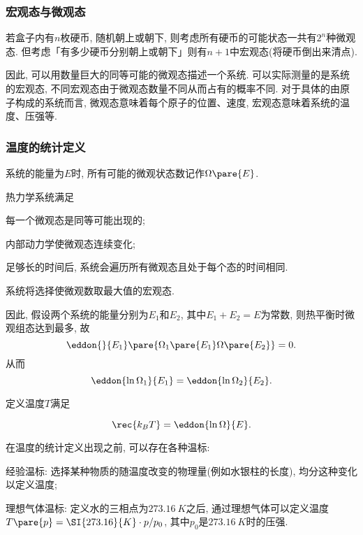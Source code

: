 \documentclass[../Thermal.tex]{subfiles}
\begin{document}
\subsubsection{宏观态与微观态}
\begin{ex}
若盒子内有$n$枚硬币, 随机朝上或朝下, 则考虑所有硬币的可能状态一共有$2^n$种微观态. 但考虑「有多少硬币分别朝上或朝下」则有$n+1$中宏观态(将硬币倒出来清点).
\end{ex}
因此, 可以用数量巨大的同等可能的微观态描述一个系统. 可以实际测量的是系统的宏观态, 不同宏观态由于微观态数量不同从而占有的概率不同. 对于具体的由原子构成的系统而言, 微观态意味着每个原子的位置、速度, 宏观态意味着系统的温度、压强等.
\subsubsection{温度的统计定义}
\begin{definition}
系统的能量为$E$时, 所有可能的微观状态数记作$\Omega\pare{E}$.
\end{definition}
\begin{axiom}
热力学系统满足
\begin{cenum}
\item 每一个微观态是同等可能出现的;
\item 内部动力学使微观态连续变化;
\item 足够长的时间后, 系统会遍历所有微观态且处于每个态的时间相同.
\end{cenum}
\end{axiom}
\begin{corollary}
系统将选择使微观数取最大值的宏观态.
\end{corollary}
因此, 假设两个系统的能量分别为$E_1$和$E_2$, 其中$E_1+E_2=E$为常数, 则热平衡时微观组态达到最多, 故
\[ \eddon{}{E_1}\pare{\Omega_1\pare{E_1}\Omega\pare{E_2}}=0. \]
从而
\[ \eddon{\ln \Omega_1}{E_1} = \eddon{\ln \Omega_2}{E_2}. \]
\begin{definition}[温度]
定义温度$T$满足
\begin{finale}
\[ \rec{k_B T} = \eddon{\ln\Omega}{E}. \]
\end{finale}
\end{definition}
\begin{remark}
	在温度的统计定义出现之前, 可以存在各种温标:
	\begin{cenum}
		\item 经验温标: 选择某种物质的随温度改变的物理量(例如水银柱的长度), 均分这种变化以定义温度;
		\item 理想气体温标: 定义水的三相点为$\SI{273.16}{K}$之后, 通过理想气体可以定义温度$T\pare{p} = \SI{273.16}{K} \cdot p/p_0$, 其中$p_0$是$\SI{273.16}{K}$时的压强.
	\end{cenum}
\end{remark}
\end{document}
